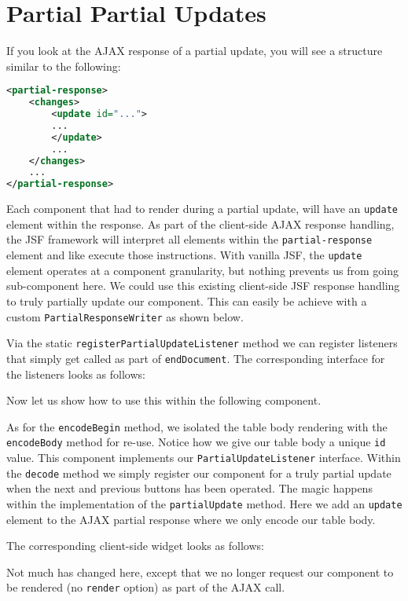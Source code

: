 \section{Partial Partial Updates}
If you look at the AJAX response of a partial update, you will see a structure similar to the following:
\begin{lstlisting}[language=XML]
<partial-response>
	<changes>
		<update id="...">
		...
		</update>
		...
	</changes>
	...
</partial-response>
\end{lstlisting}
Each component that had to render during a partial update, will have an \texttt{update} element within the response.
As part of the client-side AJAX response handling, the JSF framework will interpret all elements within the \texttt{partial-response} element and like execute those instructions.
With vanilla JSF, the \texttt{update} element operates at a component granularity, but nothing prevents us from going sub-component here.
We could use this existing client-side JSF response handling to truly partially update our component.
This can easily be achieve with a custom \texttt{PartialResponseWriter} as shown below.

Via the static \texttt{registerPartialUpdateListener} method we can register listeners that simply get called as part of \texttt{endDocument}.
The corresponding interface for the listeners looks as follows:


Now let us show how to use this within the following component.

As for the \texttt{encodeBegin} method, we isolated the table body rendering with the \texttt{encodeBody} method for re-use.
Notice how we give our table body a unique \texttt{id} value.
This component implements our \texttt{PartialUpdateListener} interface.
Within the \texttt{decode} method we simply register our component for a truly partial update when the next and previous buttons has been operated.
The magic happens within the implementation of the \texttt{partialUpdate} method.
Here we add an \texttt{update} element to the AJAX partial response where we only encode our table body.

The corresponding client-side widget looks as follows:

Not much has changed here, except that we no longer request our component to be rendered (no \texttt{render} option) as part of the AJAX call.

